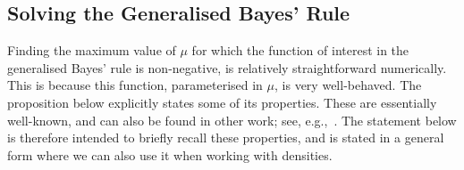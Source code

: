 \documentclass[twoside,11pt]{article}
\begin{document}

\subsection{Solving the Generalised Bayes' Rule}\label{sec:gbr}

Finding the maximum value of $\mu$ for which the function of interest in the generalised Bayes' rule is non-negative, is relatively straightforward numerically. This is because this function, parameterised in $\mu$, is very well-behaved. The proposition below explicitly states some of its properties. These are essentially well-known, and can also be found in other work; see, e.g.,~\cite[Section 2.7.3]{de2015credal}. The statement below is therefore intended to briefly recall these properties, and is stated in a general form where we can also use it when working with densities.
\end{document}
